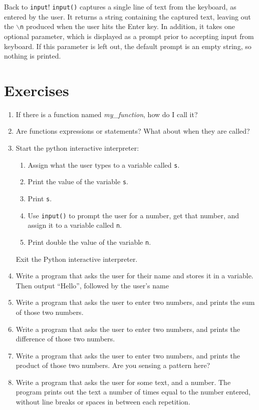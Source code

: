 Back to \texttt{input}! \texttt{input()} captures a single line of text from     the keyboard, as entered by the user. It returns a string containing     the captured text, leaving out the \texttt{$\backslash$n} produced when the user hits the     Enter key. In addition, it takes one optional parameter, which is     displayed as a prompt prior to accepting input from keyboard. If this     parameter is left out, the default prompt is an empty string, so     nothing is printed.

\section{Exercises}
\begin{enumerate}
	\item If there is a function named \textit{my\_function}, how do I call       it?
	\item Are functions expressions or statements? What about when they       are called?
	\item Start the python interactive interpreter:        
\begin{enumerate}
	\item Assign what the user types to a variable called           \texttt{s}.
	\item Print the value of the variable \texttt{s}.
	\item Print \texttt{s}.
	\item Use \texttt{input()} to prompt the user for a number, get that number, and assign it to a variable called \texttt{n}.
	\item Print double the value of the variable \texttt{n}.
\end{enumerate}        Exit the Python interactive interpreter.      
	\item Write a program that asks the user for their name and       stores it in a variable. Then output ``Hello'', followed by the       user's name
	\item Write a program that asks the user to enter two numbers, and       prints the sum of those two numbers.
	\item Write a program that asks the user to enter two numbers, and       prints the difference of those two numbers.
	\item Write a program that asks the user to enter two numbers, and       prints the product of those two numbers. Are you sensing a pattern       here?
	\item Write a program that asks the user for some text, and a number.       The program prints out the text a number of times equal to the       number entered, without line breaks or spaces in between each       repetition.
\end{enumerate}   
